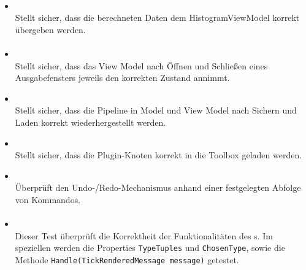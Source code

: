 \paragraph{}
\begin{itemize}
	\item{} \\
		Stellt sicher, dass die berechneten Daten dem HistogramViewModel korrekt übergeben werden.
\end{itemize}

\paragraph{}
\begin{itemize}
	\item {} \\
	Stellt sicher, dass das View Model nach Öffnen und Schließen eines Ausgabefensters jeweils den korrekten Zustand annimmt.
	\item {} \\
	Stellt sicher, dass die Pipeline in Model und View Model nach Sichern und Laden korrekt wiederhergestellt werden.
	\item {} \\
	Stellt sicher, dass die Plugin-Knoten korrekt in die Toolbox geladen werden.
	\item {} \\
	Überprüft den Undo-/Redo-Mechanismus anhand einer festgelegten Abfolge von Kommandos.
\end{itemize}

\paragraph{}

\begin{itemize}

\item{}~\\
Dieser Test überprüft die Korrektheit der Funktionalitäten des s. Im speziellen werden die Properties \verb#TypeTuples# und \verb#ChosenType#, sowie die Methode \verb#Handle(TickRenderedMessage message)# getestet.

\end{itemize}

